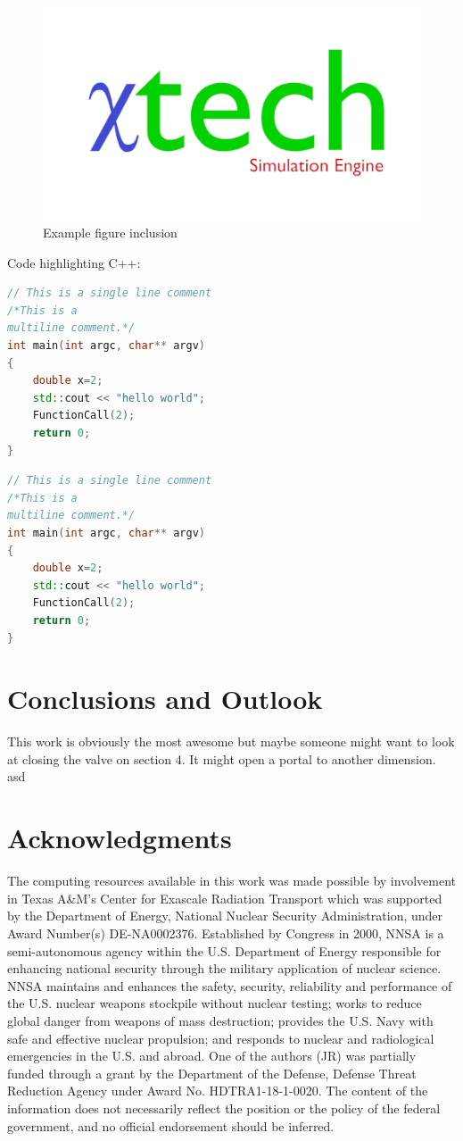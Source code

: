 \documentclass[10pt,letterpaper,openany,bibliography=totoc]{book}
\begin{document}
\begin{figure}[H]
\centering
\includegraphics[width=0.3\linewidth]{Logo2_Medium.png}
\caption{Example figure inclusion}
\label{fig:logo2medium}
\end{figure}


Code highlighting C++:
\begin{lstlisting}[language=c++,caption={Code example}]
// This is a single line comment
/*This is a
multiline comment.*/
int main(int argc, char** argv)
{
	double x=2;
	std::cout << "hello world";
	FunctionCall(2);
	return 0;
}
\end{lstlisting}
\begin{lstlisting}[language=c++,caption={Code example smaller},
                            basicstyle=\linespread{0.8} \small]
// This is a single line comment
/*This is a
multiline comment.*/
int main(int argc, char** argv)
{
	double x=2;
	std::cout << "hello world";
	FunctionCall(2);
	return 0;
}
\end{lstlisting}


\section{Conclusions and Outlook}
This work is obviously the most awesome but maybe someone might want to look at closing the valve on section 4. It might open a portal to another dimension.
asd
\newpage
\section{Acknowledgments}
The computing resources available in this work was made possible by involvement in Texas A\&M's Center for Exascale Radiation Transport which was supported by the Department of Energy, National Nuclear
Security Administration, under Award Number(s) DE-NA0002376. Established by Congress in 2000, NNSA is a semi-autonomous agency within the U.S. Department of Energy responsible for enhancing national security through the military application of nuclear science. NNSA maintains and enhances the safety, security, reliability and performance of the U.S. nuclear weapons stockpile without nuclear testing; works to reduce global danger from weapons of mass destruction; provides the U.S. Navy with safe and effective nuclear propulsion; and responds to nuclear and radiological emergencies in the U.S. and abroad.
One of the authors (JR) was partially funded through a grant by the Department of the Defense, Defense Threat Reduction Agency under Award No. HDTRA1-18-1-0020. The content of the information does not necessarily reflect the position or the policy of the federal government, and no official endorsement should be inferred.
\end{document}
